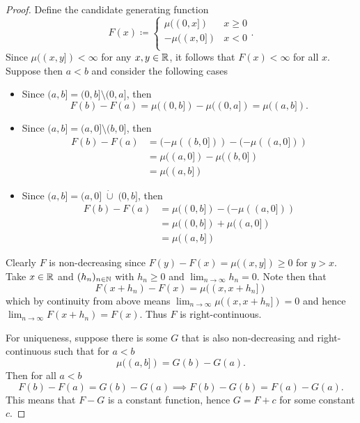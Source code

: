 \documentclass{eeleyes}
\begin{document}
\begin{proof}
    Define the candidate generating function
    \[
        F(x) \coloneq \begin{cases}
            \mu((0,x]) & x \geq 0 \\
            -\mu((x, 0]) & x < 0 \\
        \end{cases}
    .\]
    Since $\mu((x,y]) < \infty$ for any $x,y \in \mathbb{R}$, it follows that $F(x) < \infty$ for all $x$. Suppose then $a < b$ and consider the following cases
    \begin{itemize}
        \item[$a,b \geq 0$)]
            Since $(a,b] = (0, b] \setminus (0,a]$, then
            \[
                F(b) - F(a) = \mu((0,b]) - \mu((0,a]) = \mu((a,b])
            .\]

        \item[$a,b < 0$)]
            Since $(a,b] = (a,0] \setminus (b, 0]$, then
            \begin{align*}
                F(b) - F(a) &= (-\mu((b,0])) - (-\mu((a,0])) \\
                &= \mu((a,0]) - \mu((b, 0]) \\
                &= \mu((a,b])
            \end{align*}

        \item[$a < 0 \leq b$)]
            Since $(a,b] = (a,0] \;\dot{\cup}\; (0,b]$, then
            \begin{align*}
                F(b) - F(a) &= \mu((0,b]) - (-\mu((a,0])) \\
                &= \mu((0,b]) + \mu((a,0]) \\
                &= \mu((a,b])
            \end{align*}
    \end{itemize}
    Clearly $F$ is non-decreasing since $F(y) - F(x) = \mu((x,y]) \geq 0$ for $y > x$. Take $x \in \mathbb{R}$ and $(h_n)_{n \in \mathbb{N}}$ with $h_n \geq 0$ and $\lim_{n \to \infty} h_n = 0$. Note then that
    \[
        F(x + h_n) - F(x) = \mu((x, x+h_n])
    \]
    which by continuity from above means $\lim_{n \to \infty} \mu((x,x+h_n]) = 0$ and hence $\lim_{n \to \infty} F(x + h_n) = F(x)$. Thus $F$ is right-continuous.

    For uniqueness, suppose there is some $G$ that is also non-decreasing and right-continuous such that for $a < b$
    \[
        \mu((a,b]) = G(b) - G(a)
    .\]
    Then for all $a < b$
    \[
        F(b) - F(a) = G(b) - G(a) \implies F(b) - G(b) = F(a) - G(a)
    .\]
    This means that $F - G$ is a constant function, hence $G = F + c$ for some constant $c$.
\end{proof}
\end{document}

